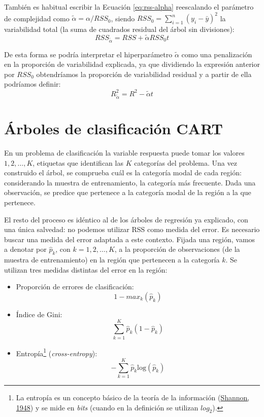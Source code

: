 \documentclass[
]{book}
\theoremstyle{break}
\theoremstyle{nonumberplain}
\begin{document}
También es habitual escribir la Ecuación \eqref{eq:rss-alpha} reescalando el parámetro de complejidad como \(\tilde \alpha = \alpha / RSS_0\), siendo \(RSS_0 = \sum_{i=1}^{n} (y_i - \bar y)^2\) la variabilidad total (la suma de cuadrados residual del árbol sin divisiones):
\[RSS_{\tilde \alpha}=RSS + \tilde \alpha RSS_0 t\]

De esta forma se podría interpretar el hiperparámetro \(\tilde \alpha\) como una penalización en la proporción de variabilidad explicada, ya que dividiendo la expresión anterior por \(RSS_0\) obtendríamos la proporción de variabilidad residual y a partir de ella podríamos definir:
\[R^2_{\tilde \alpha}=R^2 - \tilde \alpha  t\]

\hypertarget{uxe1rboles-de-clasificaciuxf3n-cart}{%
\section{Árboles de clasificación CART}\label{uxe1rboles-de-clasificaciuxf3n-cart}}

En un problema de clasificación la variable respuesta puede tomar los valores
\(1, 2, \ldots, K\), etiquetas que identifican las \(K\) categorías del problema.
Una vez construido el árbol, se comprueba cuál es la categoría modal de cada
región: considerando la muestra de entrenamiento, la categoría más frecuente.
Dada una observación, se predice que pertenece a la categoría modal de la
región a la que pertenece.

El resto del proceso es idéntico al de los árboles de regresión ya explicado,
con una única salvedad: no podemos utilizar RSS como medida del error. Es
necesario buscar una medida del error adaptada a este contexto.
Fijada una región, vamos a denotar por
\(\widehat p_{k}\), con \(k = 1, 2, \ldots, K\), a la proporción de observaciones
(de la muestra de entrenamiento) en la región que pertenecen a la categoría \(k\).
Se utilizan tres medidas distintas del error en la región:

\begin{itemize}
\item
  Proporción de errores de clasificación:
  \[1 - max_{k} (\widehat p_{k})\]
\item
  Índice de Gini:
  \[\sum_{k=1}^K \widehat p_{k} (1 - \widehat p_{k})\]
\item
  Entropía\footnote{La entropía es un concepto básico de la teoría de la información (\protect\hyperlink{ref-shannon1948mathematical}{Shannon, 1948}) y se mide en \emph{bits} (cuando en la definición se utilizan \(log_2\)).} (\emph{cross-entropy}):
  \[- \sum_{k=1}^K \widehat p_{k} \text{log}(\widehat p_{k})\]
\end{itemize}
\end{document}

